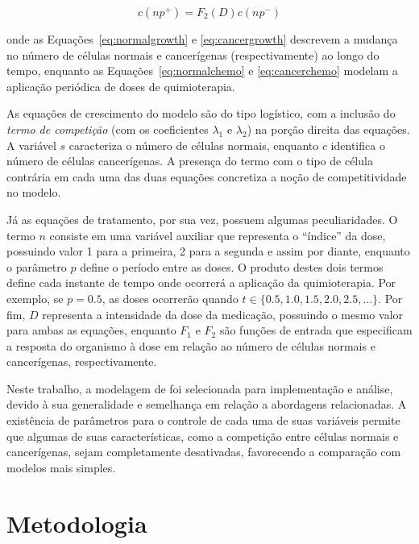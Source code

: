 \documentclass[12pt]{article}
\begin{document}
\begin{equation} \label{eq:cancerchemo}
  c(np^{+}) = F_{2}(D) c(np^{-})
\end{equation}

\noindent onde as Equações~\ref{eq:normalgrowth} e \ref{eq:cancergrowth} descrevem a mudança no número de células normais e cancerígenas (respectivamente) ao longo do tempo, enquanto as Equações~\ref{eq:normalchemo} e \ref{eq:cancerchemo} modelam a aplicação periódica de doses de quimioterapia.

As equações de crescimento do modelo são do tipo logístico, com a inclusão do \emph{termo de competição} (com os coeficientes $\lambda_1$ e $\lambda_2$) na porção direita das equações. A variável $s$ caracteriza o número de células normais, enquanto $c$ identifica o número de células cancerígenas. A presença do termo com o tipo de célula contrária em cada uma das duas equações concretiza a noção de competitividade no modelo.

Já as equações de tratamento, por sua vez, possuem algumas peculiaridades. O termo $n$ consiste em uma variável auxiliar que representa o ``índice'' da dose, possuindo valor 1 para a primeira, 2 para a segunda e assim por diante, enquanto o parâmetro $p$ define o período entre as doses. O produto destes dois termos define cada instante de tempo onde ocorrerá a aplicação da quimioterapia. Por exemplo, se $p = 0.5$, as doses ocorrerão quando $t \in \{0.5, 1.0, 1.5, 2.0, 2.5, ...\}$. Por fim, $D$ representa a intensidade da dose da medicação, possuindo o mesmo valor para ambas as equações, enquanto $F_1$ e $F_2$ são funções de entrada que especificam a resposta do organismo à dose em relação ao número de células normais e cancerígenas, respectivamente.


Neste trabalho, a modelagem de \cite{Panetta1996} foi selecionada para implementação e análise, devido à sua generalidade e semelhança em relação a abordagens relacionadas. A existência de parâmetros para o controle de cada uma de suas variáveis permite que algumas de suas características, como a competição entre células normais e cancerígenas, sejam completamente desativadas, favorecendo a comparação com modelos mais simples.

\section{Metodologia} \label{sec:methodology} %
\end{document}
